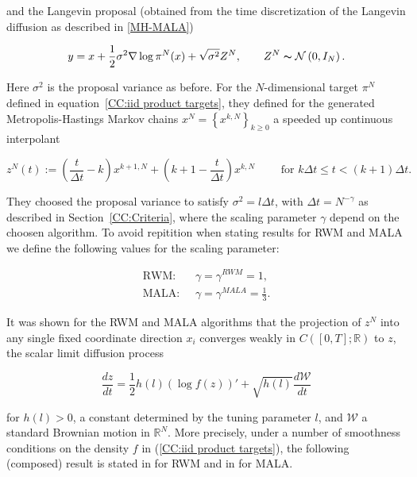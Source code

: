 and the Langevin proposal (obtained from the time discretization of the Langevin diffusion as described in \ref{MH-MALA})

\begin{equation}
 \label{CC:MALAProposals}
 y = x + \frac{1}{2} \sigma^2 \nabla \log \pi^{N} (x) + \sqrt{\sigma^2} Z^N, \qquad Z^{N} \thicksim \mathcal{N}\left( 0,I_N \right).
\end{equation}

Here $\sigma^2 $ is the proposal variance as before. 
For the $N$-dimensional target $\pi^{N}$ defined in equation~\ref{CC:iid product targets}, they defined for the generated Metropolis-Hastings Markov chains $ x^{N} = \left\{ x^{k,N}\right\}_{k \geq 0} $ a speeded up continuous interpolant

\begin{equation}
\label{CC:Continuous interpolant 2}
 z^{N}(t) := \left( \frac{t}{\Delta t} -k \right) x^{k+1,N} + \left( k+1 - \frac{t}{\Delta t} \right) x^{k,N} \qquad \text{ for } k \Delta t \leq t < (k+1)\Delta t.
\end{equation}

They choosed the proposal variance to satisfy $ \sigma^2 = l \Delta t $, with $ \Delta t = N^{-\gamma} $ as described in Section~\ref{CC:Criteria}, where the scaling parameter $\gamma$ depend on the choosen algorithm. To avoid repitition when stating results for RWM and MALA we define the following values for the scaling parameter:

\begin{align}
 \text{RWM: } & \; \gamma = \gamma^{RWM} = 1, \\
 \text{MALA: } & \; \gamma = \gamma^{MALA} = \frac{1}{3}.
\end{align}

It was shown for the RWM and MALA algorithms that the projection of $z^{N}$ into any single fixed coordinate direction $x_i$ converges weakly in $ C \left( [0,T];\mathbb{R} \right) $ to $z$, the scalar limit diffusion process

\begin{equation}
 \label{CC:Scalar Limit Diffusion}
 \frac{dz}{dt} = \frac{1}{2} h(l) \left( \log f(z) \right)' + \sqrt{h(l)}\frac{d\mathcal{W}}{dt}
\end{equation}

for $ h(l) > 0 $, a constant determined by the tuning parameter $l$, and $ \mathcal{W} $ a standard Brownian motion in $ \mathbb{R}^{N} $.
More precisely, under a number of smoothness conditions on the density $f$ in (\ref{CC:iid product targets}), the following (composed) result is stated in \autocite{Roberts1997} for RWM and in \autocite{Roberts1998} for MALA.

